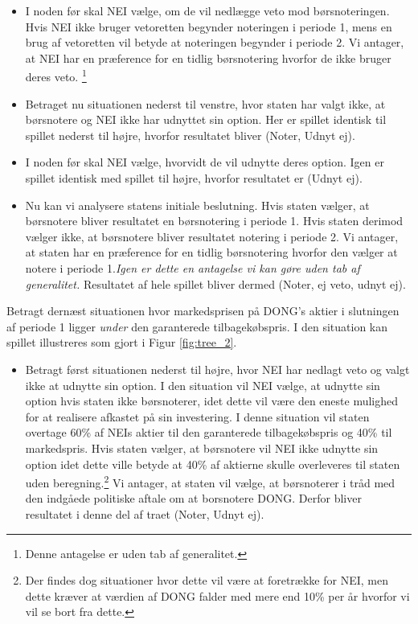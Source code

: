 \documentclass{article}
\begin{document}
\begin{appendices}
\begin{itemize}
			\item I noden før skal NEI vælge, om de vil nedlægge veto mod børsnoteringen. Hvis NEI ikke bruger vetoretten begynder noteringen i periode 1, mens en brug af vetoretten vil betyde at noteringen begynder i periode 2. Vi antager, at NEI har en præference for en tidlig børsnotering hvorfor de ikke bruger deres veto. \footnote{Denne antagelse er uden tab af generalitet.}
	
	\item Betraget nu situationen nederst til venstre, hvor staten har valgt ikke, at børsnotere og NEI ikke har udnyttet sin option. Her er spillet identisk til spillet nederst til højre, hvorfor resultatet bliver (Noter, Udnyt ej).
	
	\item I noden før skal NEI vælge, hvorvidt de vil udnytte deres option. Igen er spillet identisk med spillet til højre, hvorfor resultatet er (Udnyt ej). 
	
	\item Nu kan vi analysere statens initiale beslutning. Hvis staten vælger, at børsnotere bliver resultatet en børsnotering i periode 1. Hvis staten derimod vælger ikke, at børsnotere bliver resultatet notering i periode 2. Vi antager, at staten har en præference for en tidlig børsnotering hvorfor den vælger at notere i periode 1.\emph{Igen er dette en antagelse vi kan gøre uden tab af generalitet.} Resultatet af hele spillet bliver dermed (Noter, ej veto, udnyt ej).
 
\end{itemize}

Betragt dernæst situationen hvor markedsprisen på DONG's aktier i slutningen af periode 1 ligger \textit{under} den garanterede tilbagekøbspris. I den situation kan spillet illustreres som gjort i Figur \ref{fig:tree_2}.

\begin{itemize}

	\item Betragt først situationen nederst til højre, hvor NEI har nedlagt veto og valgt ikke at udnytte sin option. I den situation vil NEI vælge, at udnytte sin option hvis staten ikke børsnoterer, idet dette vil være den eneste mulighed for at realisere afkastet på sin investering. I denne situation vil staten overtage 60\% af NEIs aktier til den garanterede tilbagekøbspris og 40\% til markedspris. Hvis staten vælger, at børsnotere vil NEI ikke udnytte sin option idet dette ville betyde at 40\% af aktierne skulle overleveres til staten uden beregning.\footnote{Der findes dog situationer hvor dette vil være at foretrække for NEI, men dette kræver at værdien af DONG falder med mere end 10\% per år hvorfor vi vil se bort fra dette.} Vi antager, at staten vil vælge, at børsnoterer i tråd med den indgåede politiske aftale om at borsnotere DONG. Derfor bliver resultatet i denne del af traet (Noter, Udnyt ej).
	

\end{itemize}
\end{appendices}
\end{document}
